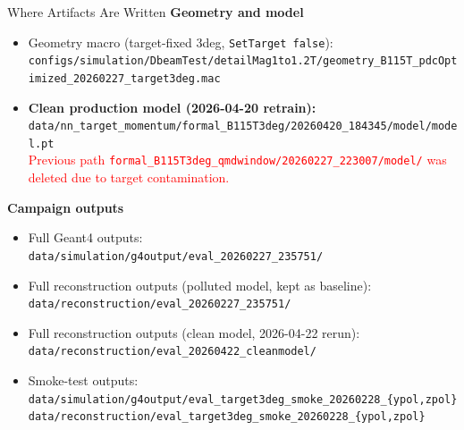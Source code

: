 \documentclass[11pt]{beamer}
\begin{document}
\begin{frame}{Where Artifacts Are Written}
\textbf{Geometry and model}
\begin{itemize}
\item Geometry macro (target-fixed 3deg, \texttt{SetTarget false}):\\
\texttt{configs/simulation/DbeamTest/detailMag1to1.2T/geometry\_B115T\_pdcOptimized\_20260227\_target3deg.mac}
\item \textbf{Clean production model (2026-04-20 retrain):}\\
\texttt{data/nn\_target\_momentum/formal\_B115T3deg/20260420\_184345/model/model.pt}\\
\textcolor{red}{Previous path
\texttt{formal\_B115T3deg\_qmdwindow/20260227\_223007/model/} was deleted
due to target contamination.}
\end{itemize}

\textbf{Campaign outputs}
\begin{itemize}
\item Full Geant4 outputs:\\
\texttt{data/simulation/g4output/eval\_20260227\_235751/}
\item Full reconstruction outputs (polluted model, kept as baseline):\\
\texttt{data/reconstruction/eval\_20260227\_235751/}
\item Full reconstruction outputs (clean model, 2026-04-22 rerun):\\
\texttt{data/reconstruction/eval\_20260422\_cleanmodel/}
\item Smoke-test outputs:\\
\texttt{data/simulation/g4output/eval\_target3deg\_smoke\_20260228\_\{ypol,zpol\}}\\
\texttt{data/reconstruction/eval\_target3deg\_smoke\_20260228\_\{ypol,zpol\}}
\end{itemize}
\end{frame}
\end{document}

